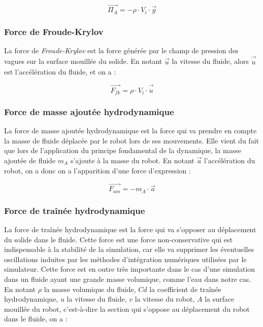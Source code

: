				\begin{equation}
					\overrightarrow{\Pi_A} = - \rho \cdot V_i \cdot \overrightarrow{g}
				\end{equation}

			\subsubsection{Force de Froude-Krylov}

				La force de \textit{Froude-Krylov} est la force générée par le champ de pression des vagues sur la surface mouillée du solide. En notant $\overrightarrow{u}$ la vitesse du fluide, alors $\overrightarrow{\dot{u}}$ est l'accélération du fluide, et on a :

				\begin{equation}
					\overrightarrow{F_{fk}} = \rho \cdot V_i \cdot \overrightarrow{\dot{u}}
				\end{equation}

			\subsubsection{Force de masse ajoutée hydrodynamique}

				La force de masse ajoutée hydrodynamique est la force qui va prendre en compte la masse de fluide déplacée par le robot lors de ses mouvements. Elle vient du fait que lors de l'application du principe fondamental de la dynamique, la masse ajoutée de fluide $m_A$ s'ajoute à la masse du robot. En notant $\overrightarrow{a}$ l'accélération du robot, on a donc on a l'apparition d'une force d'expression :
				
				\begin{equation}
					\overrightarrow{F_{am}} = - m_A \cdot \overrightarrow{a}
				\end{equation}

			\subsubsection{Force de traînée hydrodynamique}

				La force de traînée hydrodynamique est la force qui va s'opposer au déplacement du solide dans le fluide. Cette force est une force non-conservative qui est indispensable à la stabilité de la simulation, car elle va supprimer les éventuelles oscillations induites par les méthodes d'intégration numériques utilisées par le simulateur. Cette force est en outre très importante dans le cas d'une simulation dans un fluide ayant une grande masse volumique, comme l'eau dans notre cas. En notant $\rho$ la masse volumique du fluide, $Cd$ la coefficient de traînée hydrodynamique, $u$ la vitesse du fluide, $v$ la vitesse du robot, $A$ la surface mouillée du robot, c'est-à-dire la section qui s'oppose au déplacement du robot dans le fluide, on a :

